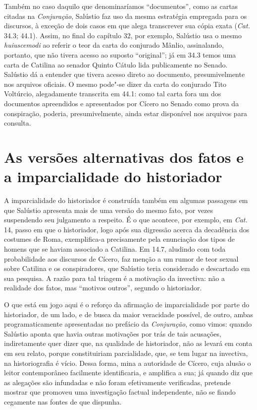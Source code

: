  Também no caso daquilo que denominaríamos  “documentos”, como as cartas
 citadas na \emph{Conjuração}, Salústio faz uso da mesma estratégia empregada
 para os discursos, à exceção de dois casos em que alega transcrever
 sua cópia exata (\emph{Cat.} 34.3; 44.1). Assim, no final do capítulo 32, por exemplo, Salústio usa o mesmo 
\emph{huiuscemodi} ao referir o teor da carta do conjurado Mânlio, assinalando, portanto, que não tivera acesso ao suposto ``original''; já em 34.3 temos uma carta de Catilina ao senador Quinto Cátulo lida publicamente no Senado. Salústio dá a entender que tivera acesso direto ao documento, presumivelmente nos arquivos oficiais. O mesmo pode"-se dizer da carta do conjurado Tito Voltúrcio, alegadamente transcrita em 44.1: como tal carta fora um dos documentos apreendidos e apresentados por Cícero no Senado como prova da conspiração, poderia, presumivelmente, ainda estar disponível nos arquivos para consulta. 

 

\section{As versões alternativas dos fatos e  a imparcialidade do historiador}

 A imparcialidade do historiador é construída também em algumas passagens em
 que Salústio apresenta mais de uma versão do mesmo fato, por vezes suspendendo
 seu julgamento a respeito. É o que acontece, por exemplo, em \emph{Cat.} 14, passo em
 que o historiador, logo após sua digressão acerca da decadência dos costumes
 de Roma, exemplifica-a precisamente pela enunciação dos tipos de homens que se
 haviam associado a Catilina. Em 14.7, aludindo com toda probabilidade aos discursos de 
 Cícero, faz menção a um rumor de teor sexual sobre Catilina e os conspiradores, que Salústio teria considerado e
 descartado em sua pesquisa. A razão para tal triagem é a motivação da invectiva: não a realidade dos fatos, mas ``motivos outros'', segundo o historiador. 
 
 O que está em jogo aqui é o reforço da afirmação de
 imparcialidade por parte do historiador, de um lado, e de busca da maior
 veracidade possível, de outro, ambas programaticamente apresentadas no
 prefácio da \emph{Conjuração}, como vimos: quando Salústio aponta que havia
 outras motivações por trás de tais acusações, indiretamente quer dizer que, na
 qualidade de historiador, não as levará em conta em seu relato, porque
 constituiriam parcialidade, que, se tem lugar na invectiva, na historiografia
 é vício. 
 Dessa forma, mina a autoridade
 de Cícero, cuja alusão o leitor contemporâneo facilmente identificaria, e
 amplifica a sua; já quando diz que as alegações são infundadas e não foram
 efetivamente verificadas, pretende mostrar que promoveu uma investigação
 factual independente, não se fiando cegamente nas fontes de que dispunha.
 

